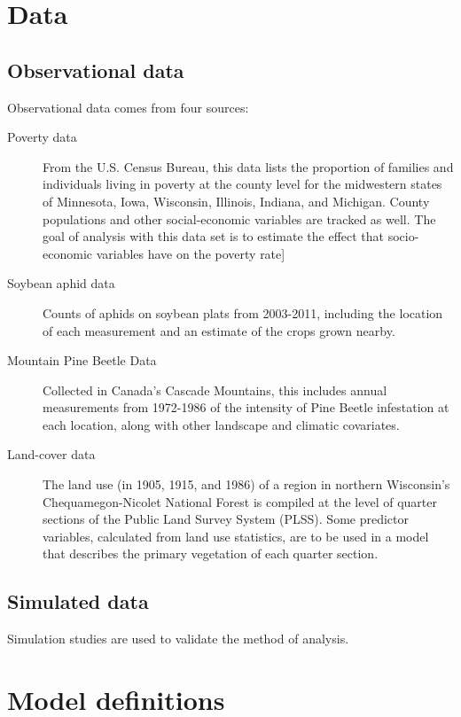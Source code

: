 \documentclass[10pt]{amsart}
\newcommand{\vect}[1]{\boldsymbol{#1}}
\begin{document}
\section{Data}
	\subsection{Observational data}
		Observational data comes from four sources:\\
		
		\begin{description}
			\item[Poverty data] From the U.S. Census Bureau, this data lists the proportion of families and individuals living in poverty at the county level for the midwestern states of Minnesota, Iowa, Wisconsin, Illinois, Indiana, and Michigan. County populations and other social-economic variables are tracked as well. The goal of analysis with this data set is to estimate the effect that socio-economic variables have on the poverty rate]
			\item[Soybean aphid data] Counts of aphids on soybean plats from 2003-2011, including the location of each measurement and an estimate of the crops grown nearby.
			\item[Mountain Pine Beetle Data] Collected in Canada's Cascade Mountains, this includes annual measurements from 1972-1986 of the intensity of Pine Beetle infestation at each location, along with other landscape and climatic covariates.
			\item[Land-cover data] The land use (in 1905, 1915, and 1986) of a region in northern Wisconsin's Chequamegon-Nicolet National Forest is compiled at the level of quarter sections of the Public Land Survey System (PLSS). Some predictor variables, calculated from land use statistics, are to be used in a model that describes the primary vegetation of each quarter section.
		\end{description}
  
	\subsection{Simulated data}
		Simulation studies are used to validate the method of analysis.\\
	
\section{Model definitions}
	
\end{document}
